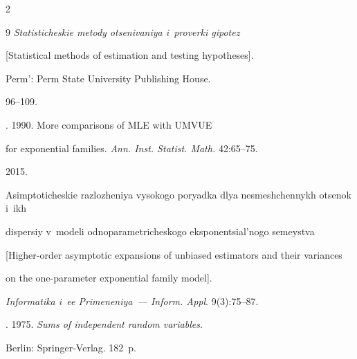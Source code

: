 \begin{multicols}{2}
{{\begin{thebibliography}{9}
\textit{Statisticheskie metody otsenivaniya i~proverki gipotez} 


[Statistical methods of  estimation and testing hypotheses]. 


Perm': Perm State University Publishing House.\linebreak 


96--109.





\pagebreak










. 1990. More comparisons of MLE with UMVUE 


for exponential families. \textit{Ann. Inst. Statist. Math.} 42:65--75.












 2015. 


Asimptoticheskie razlozheniya vysokogo poryadka dlya nesmeshchennykh otsenok i~ikh 


dispersiy v~modeli odnoparametricheskogo eksponentsial'nogo semeystva 


[Higher-order asymptotic expansions of unbiased estimators and their variances 


on the one-parameter exponential family model]. 


\textit{Informatika i~ee Primeneniya~--- Inform. Appl}. 9(3):75--87.












. 1975. \textit{Sums of independent random variables}. 


Berlin: Springer-Verlag. 182~p.














\end{thebibliography}}}
\end{multicols}
